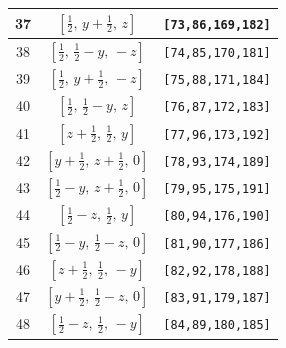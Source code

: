 \documentclass[fleqn,8pt]{jsarticle}
\begin{document}
\begin{longtable}{ccc}
37 & $\left[ \frac{1}{2},\, y + \frac{1}{2},\, z \right]$ & {\tt [73,86,169,182]} \\ \hline
38 & $\left[ \frac{1}{2},\, \frac{1}{2} - y,\, - z \right]$ & {\tt [74,85,170,181]} \\ \hline
39 & $\left[ \frac{1}{2},\, y + \frac{1}{2},\, - z \right]$ & {\tt [75,88,171,184]} \\ \hline
40 & $\left[ \frac{1}{2},\, \frac{1}{2} - y,\, z \right]$ & {\tt [76,87,172,183]} \\ \hline
41 & $\left[ z + \frac{1}{2},\, \frac{1}{2},\, y \right]$ & {\tt [77,96,173,192]} \\ \hline
42 & $\left[ y + \frac{1}{2},\, z + \frac{1}{2},\, 0 \right]$ & {\tt [78,93,174,189]} \\ \hline
43 & $\left[ \frac{1}{2} - y,\, z + \frac{1}{2},\, 0 \right]$ & {\tt [79,95,175,191]} \\ \hline
44 & $\left[ \frac{1}{2} - z,\, \frac{1}{2},\, y \right]$ & {\tt [80,94,176,190]} \\ \hline
45 & $\left[ \frac{1}{2} - y,\, \frac{1}{2} - z,\, 0 \right]$ & {\tt [81,90,177,186]} \\ \hline
46 & $\left[ z + \frac{1}{2},\, \frac{1}{2},\, - y \right]$ & {\tt [82,92,178,188]} \\ \hline
47 & $\left[ y + \frac{1}{2},\, \frac{1}{2} - z,\, 0 \right]$ & {\tt [83,91,179,187]} \\ \hline
48 & $\left[ \frac{1}{2} - z,\, \frac{1}{2},\, - y \right]$ & {\tt [84,89,180,185]} \\
\end{longtable}
\renewcommand{\arraystretch}{1.2}
\end{document}
